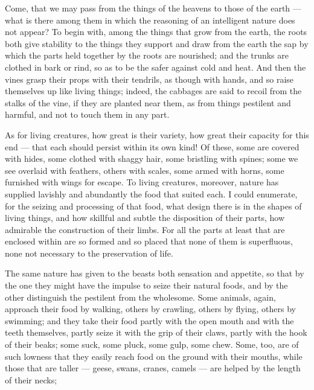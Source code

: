  Come, that we may pass from the things of the heavens to those of the earth — what is there among them in which the reasoning of an intelligent nature does not appear? To begin with, among the things that grow from the earth, the roots both give stability to the things they support and draw from the earth the sap by which the parts held together by the roots are nourished; and the trunks are clothed in bark or rind, so as to be the safer against cold and heat. And then the vines grasp their props with their tendrils, as though with hands, and so raise themselves up like living things; indeed, the cabbages are said to recoil from the stalks of the vine, if they are planted near them, as from things pestilent and harmful, and not to touch them in any part.

 As for living creatures, how great is their variety, how great their capacity for this end — that each should persist within its own kind! Of these, some are covered with hides, some clothed with shaggy hair, some bristling with spines; some we see overlaid with feathers, others with scales, some armed with horns, some furnished with wings for escape. To living creatures, moreover, nature has supplied lavishly and abundantly the food that suited each. I could enumerate, for the seizing and processing of that food, what design there is in the shapes of living things, and how skillful and subtle the disposition of their parts, how admirable the construction of their limbs. For all the parts at least that are enclosed within are so formed and so placed that none of them is superfluous, none not necessary to the preservation of life.

 The same nature has given to the beasts both sensation and appetite, so that by the one they might have the impulse to seize their natural foods, and by the other distinguish the pestilent from the wholesome. Some animals, again, approach their food by walking, others by crawling, others by flying, others by swimming; and they take their food partly with the open mouth and with the teeth themselves, partly seize it with the grip of their claws, partly with the hook of their beaks; some suck, some pluck, some gulp, some chew. Some, too, are of such lowness that they easily reach food on the ground with their mouths, while those that are taller — geese, swans, cranes, camels — are helped by the length of their necks;

